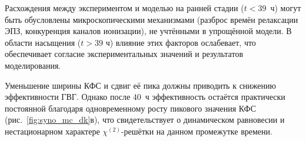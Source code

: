 Расхождения между экспериментом и моделью на ранней стадии ($t < 39$~ч) могут быть обусловлены микроскопическими механизмами (разброс времён релаксации ЭПЗ, конкуренция каналов ионизации), не учтёнными в упрощённой модели. В области насыщения ($t > 39$ ч) влияние этих факторов ослабевает, что обеспечивает согласие экспериментальных значений и результатов моделирования.

Уменьшение ширины КФС и сдвиг её пика должны приводить к снижению эффективности ГВГ. Однако после 40~ч эффективность остаётся практически постоянной благодаря одновременному росту пикового значения КФС (рис.~\cref{fig:syno_mc_dk}в), что свидетельствует о динамическом равновесии и нестационарном характере $\chi^{(2)}$-решётки на данном промежутке времени.

